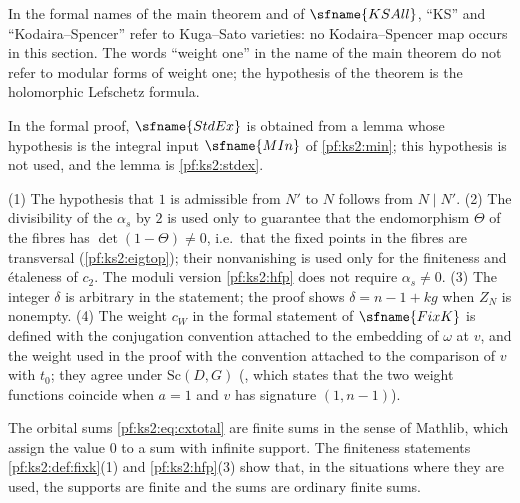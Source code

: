 \begin{remark}[Names]\label{pf:ks2:rem:names}
In the formal names of the main theorem and of $\sfname{KSAll}$, ``KS'' and ``Kodaira--Spencer''
refer to Kuga--Sato varieties: no Kodaira--Spencer map occurs in this section. The words ``weight
one'' in the name of the main theorem do not refer to modular forms of weight one; the hypothesis of
the theorem is the holomorphic Lefschetz formula.
\end{remark}

\begin{remark}\label{pf:ks2:rem:unused}
In the formal proof, $\sfname{StdEx}$ is obtained from a lemma whose hypothesis is the integral input
$\sfname{MIn}$ of \cref{pf:ks2:min}; this hypothesis is not used, and the lemma is
\cref{pf:ks2:stdex}.
\end{remark}

\begin{remark}\label{pf:ks2:rem:fixk}
(1) The hypothesis that $1$ is admissible from $N'$ to $N$ follows from $N\mid N'$.
(2) The divisibility of the $\alpha_s$ by $2$ is used only to guarantee that the endomorphism
$\Theta$ of the fibres has $\det(1-\Theta)\ne0$, i.e.\ that the fixed points in the fibres are
transversal (\cref{pf:ks2:eigtop}); their nonvanishing is used only for the finiteness and
\'etaleness of $c_2$. The moduli version \cref{pf:ks2:hfp} does not require $\alpha_s\ne0$.
(3) The integer $\delta$ is arbitrary in the statement; the proof shows $\delta=n-1+kg$ when $Z_N$ is
nonempty.
(4) The weight $c_W$ in the formal statement of $\sfname{FixK}$ is defined with the conjugation
convention attached to the embedding of $\omega$ at $v$, and the weight used in the proof with the
convention attached to the comparison of $v$ with $t_0$; they agree under $\mathrm{Sc}(D,G)$
(, which states that the two weight functions coincide when
$a=1$ and $v$ has signature $(1,n-1)$).
\end{remark}

\begin{remark}\label{pf:ks2:rem:finsum}
The orbital sums \eqref{pf:ks2:eq:cxtotal} are finite sums in the sense of Mathlib, which assign the
value $0$ to a sum with infinite support. The finiteness statements \cref{pf:ks2:def:fixk}(1) and
\cref{pf:ks2:hfp}(3) show that, in the situations where they are used, the supports are finite and
the sums are ordinary finite sums.
\end{remark}

